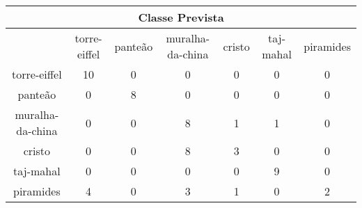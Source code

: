 \begin{tabular}{|c|c|c|c|c|c|c|}
\hline
\multicolumn{7}{|c|}{Classe Prevista}\\
\hline
 & torre-eiffel & panteão & muralha-da-china & cristo & taj-mahal & piramides\\
torre-eiffel & 10 & 0 & 0 & 0 & 0 & 0\\
panteão & 0 & 8 & 0 & 0 & 0 & 0\\
muralha-da-china & 0 & 0 & 8 & 1 & 1 & 0\\
cristo & 0 & 0 & 8 & 3 & 0 & 0\\
taj-mahal & 0 & 0 & 0 & 0 & 9 & 0\\
piramides & 4 & 0 & 3 & 1 & 0 & 2\\
\hline
\end{tabular}
